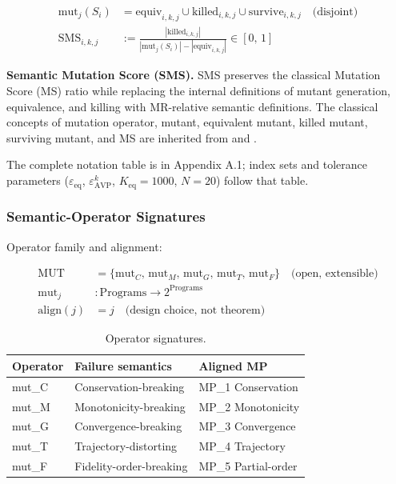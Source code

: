 \documentclass[manuscript,screen,review]{acmart}
\begin{document}
\begin{align*}
\mathrm{mut}_j(S_i) &= \mathrm{equiv}_{i,k,j} \cup \mathrm{killed}_{i,k,j} \cup \mathrm{survive}_{i,k,j} \quad \text{(disjoint)} \\
\mathrm{SMS}_{i,k,j} &:= \frac{|\mathrm{killed}_{i,k,j}|}{|\mathrm{mut}_j(S_i)| - |\mathrm{equiv}_{i,k,j}|} \in [0,\,1]
\end{align*}

\textbf{Semantic Mutation Score (SMS).} SMS preserves the classical
Mutation Score (MS) ratio while replacing the internal definitions of
mutant generation, equivalence, and killing with MR-relative semantic
definitions. The classical concepts of mutation operator, mutant,
equivalent mutant, killed mutant, surviving mutant, and MS are inherited
from \citet{jia2011analysis} and
\citet{ammann2008introduction}.

The complete notation table is in Appendix A.1; index sets and tolerance
parameters ($\varepsilon_{\mathrm{eq}}$, $\varepsilon_{\mathrm{AVP}}^k$,
$K_{\mathrm{eq}} = 1000$, $N = 20$) follow that table.

\subsubsection{Semantic-Operator Signatures}\label{operator-signatures}

Operator family and alignment:

\begin{align*}
\mathrm{MUT} &= \{\mathrm{mut}_C,\, \mathrm{mut}_M,\, \mathrm{mut}_G,\, \mathrm{mut}_T,\, \mathrm{mut}_F\} \quad \text{(open, extensible)} \\
\mathrm{mut}_j &: \text{Programs} \to 2^{\text{Programs}} \\
\mathrm{align}(j) &= j \quad \text{(design choice, not theorem)}
\end{align*}

\begin{table}[t]
\caption{Operator signatures.}\label{tab:p2-01}
\centering
\begin{tabular}{@{}lll@{}}
\toprule
Operator & Failure semantics & Aligned MP \\
\midrule
mut\_C & Conservation-breaking & MP\_1 Conservation \\
mut\_M & Monotonicity-breaking & MP\_2 Monotonicity \\
mut\_G & Convergence-breaking & MP\_3 Convergence \\
mut\_T & Trajectory-distorting & MP\_4 Trajectory \\
mut\_F & Fidelity-order-breaking & MP\_5 Partial-order \\
\bottomrule
\end{tabular}
\end{table}
\end{document}
